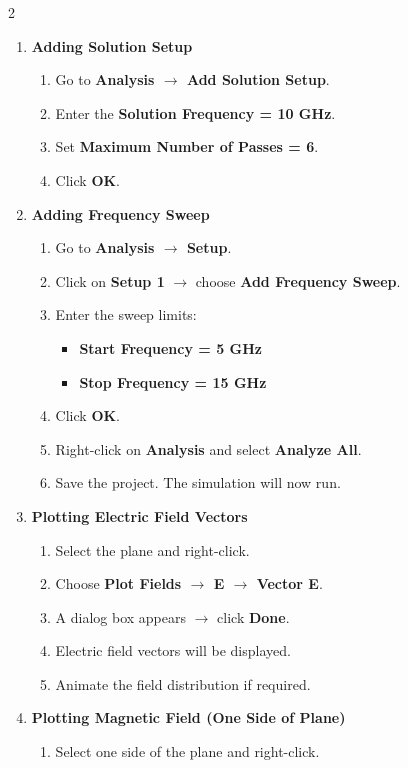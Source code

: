 \documentclass[11pt, a4paper]{article}
\begin{document}
\begin{multicols}{2}
\begin{enumerate}[leftmargin=*, itemsep=15pt]
\begin{enumerate}
			\item Click \textbf{OK}.
		\end{enumerate}
	\item \textbf{Adding Solution Setup}
		\begin{enumerate}
		\item Go to \textbf{Analysis $\rightarrow$ Add Solution Setup}.
			\item Enter the \textbf{Solution Frequency = 10 GHz}.
			\item Set \textbf{Maximum Number of Passes = 6}.
			\item Click \textbf{OK}.
		\end{enumerate}
	\item \textbf{Adding Frequency Sweep}
		\begin{enumerate}
		\item Go to \textbf{Analysis $\rightarrow$ Setup}.
			\item Click on \textbf{Setup 1} $\rightarrow$ choose \textbf{Add Frequency Sweep}.
			\item Enter the sweep limits:
			\begin{itemize}
				\item \textbf{Start Frequency = 5 GHz}
				\item \textbf{Stop Frequency = 15 GHz}
			\end{itemize}
			\item Click \textbf{OK}.
			\item Right-click on \textbf{Analysis} and select \textbf{Analyze All}.
			\item Save the project. The simulation will now run.
		\end{enumerate}
	\item \textbf{Plotting Electric Field Vectors}
		\begin{enumerate}
		\item Select the plane and right-click.
			\item Choose \textbf{Plot Fields $\rightarrow$ E $\rightarrow$ Vector E}.
			\item A dialog box appears $\rightarrow$ click \textbf{Done}.
			\item Electric field vectors will be displayed.
			\item Animate the field distribution if required.
		\end{enumerate}
	\item \textbf{Plotting Magnetic Field (One Side of Plane)}
		\begin{enumerate}
		\item Select one side of the plane and right-click.

\end{enumerate}
\end{enumerate}
\end{multicols}
\end{document}
